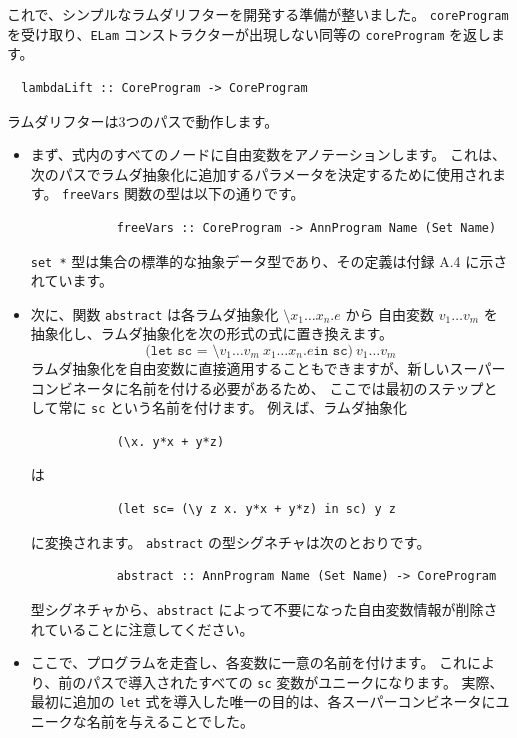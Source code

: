 \documentclass{jbook}
\begin{document}
これで、シンプルなラムダリフターを開発する準備が整いました。
\texttt{coreProgram} を受け取り、\texttt{ELam} コンストラクターが出現しない同等の \texttt{coreProgram} を返します。

\begin{verbatim}
  lambdaLift :: CoreProgram -> CoreProgram
\end{verbatim}

ラムダリフターは3つのパスで動作します。

\begin{itemize}
	\item まず、式内のすべてのノードに自由変数をアノテーションします。
	      これは、次のパスでラムダ抽象化に追加するパラメータを決定するために使用されます。
	      \texttt{freeVars} 関数の型は以下の通りです。
	      \begin{verbatim}
            freeVars :: CoreProgram -> AnnProgram Name (Set Name)
          \end{verbatim}
	      \texttt{set *} 型は集合の標準的な抽象データ型であり、その定義は付録 A.4 に示されています。
	\item 次に、関数 \texttt{abstract} は各ラムダ抽象化 $\texttt{\textbackslash}x_1 \ldots x_n \texttt{.} e$ から
	      自由変数 $v_1 \ldots v_m$ を抽象化し、ラムダ抽象化を次の形式の式に置き換えます。
	      \[
		      \texttt{(let sc = \textbackslash}v_1 \ldots v_m ~ x_1 \ldots x_n \texttt{.} e \texttt{in sc}) ~ v_1 \ldots v_m
	      \]
	      ラムダ抽象化を自由変数に直接適用することもできますが、新しいスーパーコンビネータに名前を付ける必要があるため、
	      ここでは最初のステップとして常に \texttt{sc} という名前を付けます。
	      例えば、ラムダ抽象化
	      \begin{verbatim}
			(\x. y*x + y*z)
		  \end{verbatim}
	      は
	      \begin{verbatim}
			(let sc= (\y z x. y*x + y*z) in sc) y z
		  \end{verbatim}
	      に変換されます。
	      \texttt{abstract} の型シグネチャは次のとおりです。
	      \begin{verbatim}
        	abstract :: AnnProgram Name (Set Name) -> CoreProgram
          \end{verbatim}
	      型シグネチャから、\texttt{abstract} によって不要になった自由変数情報が削除されていることに注意してください。
	\item ここで、プログラムを走査し、各変数に一意の名前を付けます。
	      これにより、前のパスで導入されたすべての \texttt{sc} 変数がユニークになります。
	      実際、最初に追加の \texttt{let} 式を導入した唯一の目的は、各スーパーコンビネータにユニークな名前を与えることでした。

\end{itemize}
\end{document}
